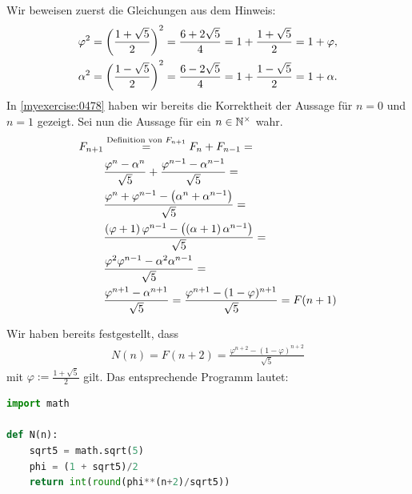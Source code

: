 \begin{myanswer}[myexercise:0477]
	Wir beweisen zuerst die Gleichungen aus dem Hinweis:
	\begin{align*}
		\varphi^2 & = \left(\frac{1+\sqrt{5}}{2}\right)^2 = \frac{6+2\sqrt{5}}{4} = 1 + \frac{1+\sqrt{5}}{2} = 1 + \varphi, \\
		\alpha^2  & = \left(\frac{1-\sqrt{5}}{2}\right)^2 = \frac{6-2\sqrt{5}}{4} = 1 + \frac{1-\sqrt{5}}{2} = 1 + \alpha.
	\end{align*}
	In \cref{myexercise:0478} haben wir bereits die Korrektheit der Aussage für $n=0$ und $n=1$ gezeigt. Sei nun die Aussage für ein $n\in\mathbb{N}^{\times}$ wahr.
	\begin{align*}
		F_{n+1} & \stackrel{\text{Definition von $F_{n+1}$}}{=} F_n + F_{n-1} =                                           \\
		        & \frac{\varphi^{n}-\alpha^{n}}{\sqrt{5}} + \frac{\varphi^{n-1}-\alpha^{n-1}}{\sqrt{5}} =                 \\
		        & \frac{\varphi^{n} + \varphi^{n-1} - \left(\alpha^{n}+\alpha^{n-1}\right)}{\sqrt{5}} =                           \\
		        & \frac{\left(\varphi + 1\right)\varphi^{n-1} - \left(\left(\alpha + 1\right)\alpha^{n-1}\right)}{\sqrt{5}} =                     \\
		        & \frac{\varphi^2\varphi^{n-1} - \alpha^2\alpha^{n-1}}{\sqrt{5}} =                                        \\
		        & \frac{\varphi^{n+1}-\alpha^{n+1}}{\sqrt{5}} = \frac{\varphi^{n+1}-(1-\varphi)^{n+1}}{\sqrt{5}} = F(n+1)
	\end{align*}
\end{myanswer}


\begin{myanswer}[myexercise:0406]
	Wir haben bereits festgestellt, dass
	\begin{align*}
		N(n) = F(n+2) = \frac{\varphi^{n+2}-(1-\varphi)^{n+2}}{\sqrt{5}}
	\end{align*}
	mit $\varphi := \frac{1+\sqrt{5}}{2}$ gilt. Das entsprechende Programm lautet:
	\begin{lstlisting}[language=Python]
import math

def N(n):
    sqrt5 = math.sqrt(5)
    phi = (1 + sqrt5)/2
    return int(round(phi**(n+2)/sqrt5))
\end{lstlisting}
\end{myanswer}

\clearpage
\shipoutAnswer
